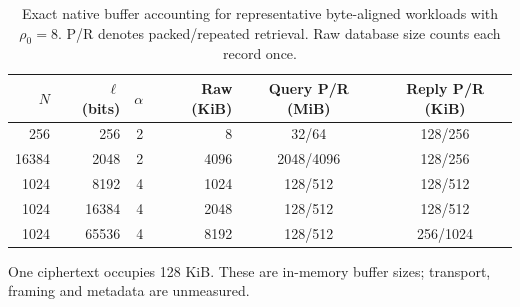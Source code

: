 \begin{table}[tbp]
\centering\small
\caption{Exact native buffer accounting for representative byte-aligned workloads with $\rho_0=8$. P/R denotes packed/repeated retrieval. Raw database size counts each record once.}
\label{tab:payload}
\setlength{\tabcolsep}{4pt}
\begin{tabular}{@{}rrrrcc@{}}
\toprule
$N$ & $\ell$ (bits) & $\alpha$ & Raw (KiB) & Query P/R (MiB) & Reply P/R (KiB) \\
\midrule
256 & 256 & 2 & 8 & 32/64 & 128/256 \\
16384 & 2048 & 2 & 4096 & 2048/4096 & 128/256 \\
1024 & 8192 & 4 & 1024 & 128/512 & 128/512 \\
1024 & 16384 & 4 & 2048 & 128/512 & 128/512 \\
1024 & 65536 & 4 & 8192 & 128/512 & 256/1024 \\
\bottomrule\end{tabular}
\par\smallskip\begin{minipage}{\linewidth}\footnotesize One ciphertext occupies 128 KiB. These are in-memory buffer sizes; transport, framing and metadata are unmeasured.\end{minipage}
\end{table}
